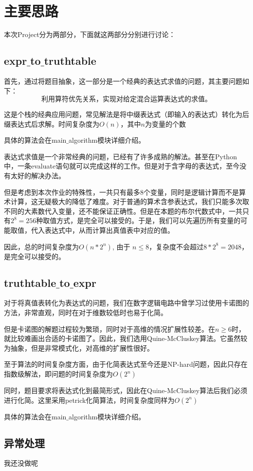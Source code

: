 \section{主要思路}

本次Project分为两部分，下面就这两部分分别进行讨论：

\subsection{expr$\_$to$\_$truthtable}
	首先，通过将题目抽象，这一部分是一个经典的表达式求值的问题，其主要问题如下：
		$$\mbox{利用算符优先关系，实现对给定混合运算表达式的求值。}$$
		
	这是个栈的经典应用问题，常见解法是将中缀表达式（即输入的表达式）转化为后缀表达式后求解。时间复杂度为$O(n)$，其中$n$为变量的个数
	
	具体的算法会在main$\_$algorithm模块详细介绍。
	
	表达式求值是一个非常经典的问题，已经有了许多成熟的解法。甚至在Python中，一条evaluate语句就可以完成这样的工作。但是对于含字母的表达式，至今没有太好的解决办法。
	
	但是考虑到本次作业的特殊性，一共只有最多8个变量，同时是逻辑计算而不是算术计算，这无疑极大的降低了难度。对于普通的算术含参表达式，我们只能多次取不同的大素数代入变量，还不能保证正确性。但是在本题的布尔代数式中，一共只有$2 ^ 8 = 256$种取值方式，是完全可以接受的。于是，我们可以先遍历所有变量的可能取值，代入表达式中，从而计算出真值表中对应的值。
	
	因此，总的时间复杂度为$O(n * 2 ^ n)$, 由于 $n \le 8$，复杂度不会超过$8 * 2 ^ 8 = 2048$，是完全可以接受的。
\subsection{truthtable$\_$to$\_$expr}

	对于将真值表转化为表达式的问题，我们在数字逻辑电路中曾学习过使用卡诺图的方法，非常直观，同时在对于维数较低时也易于化简。
	
	但是卡诺图的解题过程较为繁琐，同时对于高维的情况扩展性较差。在$n \geq 6$时，就比较难画出合适的卡诺图了。因此，我们选用Quine-McCluskey算法。它虽然较为抽象，但是非常模式化，对高维的扩展性很好。
	
	至于算法的时间复杂度方面，由于化简表达式至今还是NP-hard问题，因此只存在指数级解法，即问题的时间复杂度为$O(2 ^ n)$
	
	同时，题目要求将表达式化到最简形式，因此在Quine-McCluskey算法后我们必须进行化简。这里采用petrick化简算法，时间复杂度同样为$O(2 ^ n)$
	
	具体的算法会在main$\_$algorithm模块详细介绍。

\subsection{异常处理}
	我还没做呢